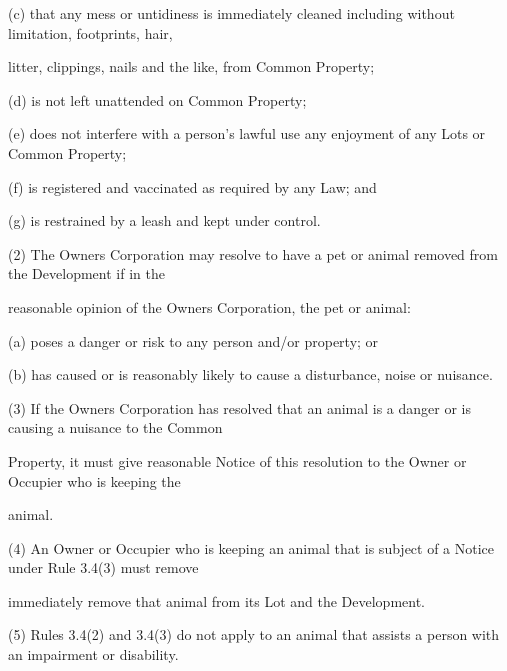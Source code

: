 \documentclass{article}
\begin{document}
{\fontsize{9.962}{1}(c) that any mess or untidiness is immediately cleaned including without limitation, footprints, hair, }

{\fontsize{10.02}{1}litter, clippings, nails and the like,  from Common Property; }

{\fontsize{9.962}{1}(d) is not left unattended on Common Property; }

{\fontsize{9.962}{1}(e) does not interfere with a person’s lawful use any enjoyment of any Lots or Common Property; }

{\fontsize{9.962}{1}(f) is registered and vaccinated as required by any Law; and }

{\fontsize{9.962}{1}(g) is restrained by a leash and kept under control. }

{\fontsize{9.962}{1}(2) The Owners Corporation may resolve to have a pet or animal removed from the Development if in the }

{\fontsize{10.02}{1}reasonable opinion of the Owners Corporation, the pet or animal: }

\newpage



















{\fontsize{9.962}{1}(a) poses a danger or risk to any person and/or property; or }

{\fontsize{9.962}{1}(b) has caused or is reasonably likely to cause a disturbance, noise or nuisance. }

{\fontsize{9.962}{1}(3) If the Owners Corporation has resolved that an animal is a danger or is causing a nuisance to the Common }

{\fontsize{10.02}{1}Property, it must give reasonable Notice of this resolution to the Owner or Occupier who is keeping the }

{\fontsize{10.02}{1}animal. }

{\fontsize{9.962}{1}(4) An Owner or Occupier who is keeping an animal that is subject of a Notice under Rule 3.4(3) must remove }

{\fontsize{10.02}{1}immediately remove that animal from its Lot and the Development. }

{\fontsize{9.962}{1}(5) Rules 3.4(2) and 3.4(3) do not apply to an animal that assists a person with an impairment or disability. }
\end{document}
